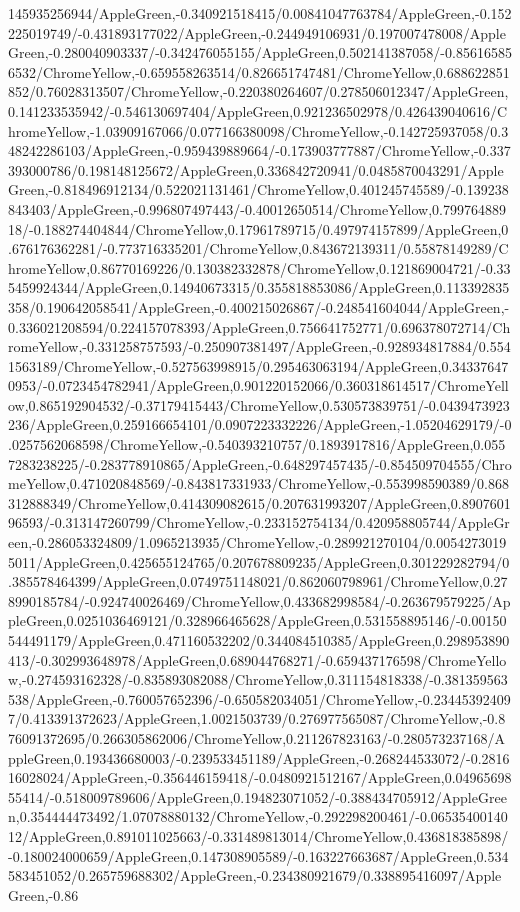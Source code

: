 {\begin{tikzternal}
145935256944/AppleGreen,-0.340921518415/0.00841047763784/AppleGreen,-0.152225019749/-0.431893177022/AppleGreen,-0.244949106931/0.197007478008/AppleGreen,-0.280040903337/-0.342476055155/AppleGreen,0.502141387058/-0.856165856532/ChromeYellow,-0.659558263514/0.826651747481/ChromeYellow,0.688622851852/0.76028313507/ChromeYellow,-0.220380264607/0.278506012347/AppleGreen,0.141233535942/-0.546130697404/AppleGreen,0.921236502978/0.426439040616/ChromeYellow,-1.03909167066/0.077166380098/ChromeYellow,-0.142725937058/0.348242286103/AppleGreen,-0.959439889664/-0.173903777887/ChromeYellow,-0.337393000786/0.198148125672/AppleGreen,0.336842720941/0.0485870043291/AppleGreen,-0.818496912134/0.522021131461/ChromeYellow,0.401245745589/-0.139238843403/AppleGreen,-0.996807497443/-0.40012650514/ChromeYellow,0.79976488918/-0.188274404844/ChromeYellow,0.17961789715/0.497974157899/AppleGreen,0.676176362281/-0.773716335201/ChromeYellow,0.843672139311/0.55878149289/ChromeYellow,0.86770169226/0.130382332878/ChromeYellow,0.121869004721/-0.335459924344/AppleGreen,0.14940673315/0.355818853086/AppleGreen,0.113392835358/0.190642058541/AppleGreen,-0.400215026867/-0.248541604044/AppleGreen,-0.336021208594/0.224157078393/AppleGreen,0.756641752771/0.696378072714/ChromeYellow,-0.331258757593/-0.250907381497/AppleGreen,-0.928934817884/0.5541563189/ChromeYellow,-0.527563998915/0.295463063194/AppleGreen,0.343376470953/-0.0723454782941/AppleGreen,0.901220152066/0.360318614517/ChromeYellow,0.865192904532/-0.37179415443/ChromeYellow,0.530573839751/-0.0439473923236/AppleGreen,0.259166654101/0.0907223332226/AppleGreen,-1.05204629179/-0.0257562068598/ChromeYellow,-0.540393210757/0.1893917816/AppleGreen,0.0557283238225/-0.283778910865/AppleGreen,-0.648297457435/-0.854509704555/ChromeYellow,0.471020848569/-0.843817331933/ChromeYellow,-0.553998590389/0.868312888349/ChromeYellow,0.414309082615/0.207631993207/AppleGreen,0.890760196593/-0.313147260799/ChromeYellow,-0.233152754134/0.420958805744/AppleGreen,-0.286053324809/1.0965213935/ChromeYellow,-0.289921270104/0.00542730195011/AppleGreen,0.425655124765/0.207678809235/AppleGreen,0.301229282794/0.385578464399/AppleGreen,0.0749751148021/0.862060798961/ChromeYellow,0.278990185784/-0.924740026469/ChromeYellow,0.433682998584/-0.263679579225/AppleGreen,0.0251036469121/0.328966465628/AppleGreen,0.531558895146/-0.00150544491179/AppleGreen,0.471160532202/0.344084510385/AppleGreen,0.298953890413/-0.302993648978/AppleGreen,0.689044768271/-0.659437176598/ChromeYellow,-0.274593162328/-0.835893082088/ChromeYellow,0.311154818338/-0.381359563538/AppleGreen,-0.760057652396/-0.650582034051/ChromeYellow,-0.234453924097/0.413391372623/AppleGreen,1.0021503739/0.276977565087/ChromeYellow,-0.876091372695/0.266305862006/ChromeYellow,0.211267823163/-0.280573237168/AppleGreen,0.193436680003/-0.239533451189/AppleGreen,-0.268244533072/-0.281616028024/AppleGreen,-0.356446159418/-0.0480921512167/AppleGreen,0.0496569855414/-0.518009789606/AppleGreen,0.194823071052/-0.388434705912/AppleGreen,0.354444473492/1.07078880132/ChromeYellow,-0.292298200461/-0.0653540014012/AppleGreen,0.891011025663/-0.331489813014/ChromeYellow,0.436818385898/-0.180024000659/AppleGreen,0.147308905589/-0.163227663687/AppleGreen,0.534583451052/0.265759688302/AppleGreen,-0.234380921679/0.338895416097/AppleGreen,-0.86
\end{tikzternal}}
